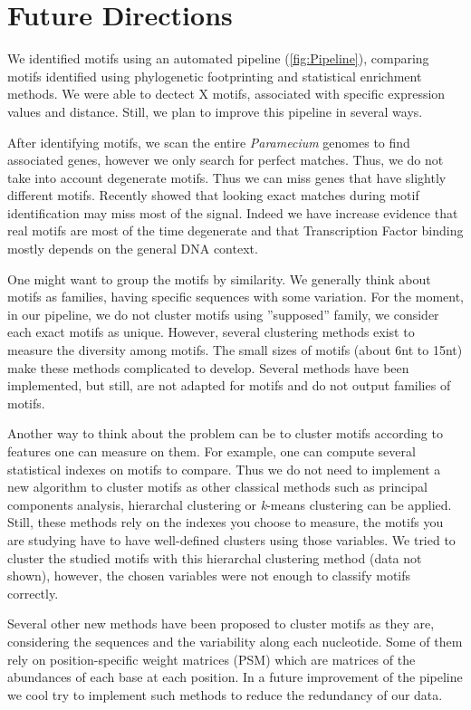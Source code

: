 \section*{Future Directions}
\label{sec:Future}

We identified motifs using an automated pipeline (\autoref{fig:Pipeline}), comparing motifs identified using phylogenetic footprinting and statistical enrichment methods. We were able to dectect X motifs, associated with specific expression values and distance. Still, we plan to improve this pipeline in several ways.

After identifying motifs, we scan the entire \textit{Paramecium} genomes to find associated genes, however we only search for perfect matches. Thus, we do not take into account degenerate motifs. Thus we can miss genes that have slightly different motifs. Recently \citeauthor{nelson_conserved_2013} showed that looking exact matches during motif identification may miss most of the signal. Indeed we have increase evidence that real motifs are most of the time degenerate and that Transcription Factor binding mostly depends on the general DNA context.

One might want to group the motifs by similarity. We generally think about motifs as families, having specific sequences with some variation. For the moment, in our pipeline, we do not cluster motifs using ''supposed'' family, we consider each exact motifs as unique. However, several clustering methods exist to measure the diversity among motifs. The small sizes of motifs (about 6nt to 15nt) make these methods complicated to develop. Several methods have been implemented, but still, are not adapted for motifs and do not output families of motifs. 

Another way to think about the problem can be to cluster motifs according to features one can measure on them. For example, one can compute several statistical indexes on motifs to compare. Thus we do not need to implement a new algorithm to cluster motifs as other classical methods such as principal components analysis, hierarchal clustering or \textit{k}-means clustering can be applied. Still, these methods rely on the indexes you choose to measure, the motifs you are studying have to have well-defined clusters using those variables. We tried to cluster the studied motifs with this hierarchal clustering method (data not shown), however, the chosen variables were not enough to classify motifs correctly.

Several other new methods have been proposed to cluster motifs as they are, considering the sequences and the variability along each nucleotide. Some of them rely on position-specific weight matrices (PSM) which are matrices of the abundances of each base at each position. In a future improvement of the pipeline we cool try to implement such methods to reduce the redundancy of our data.

